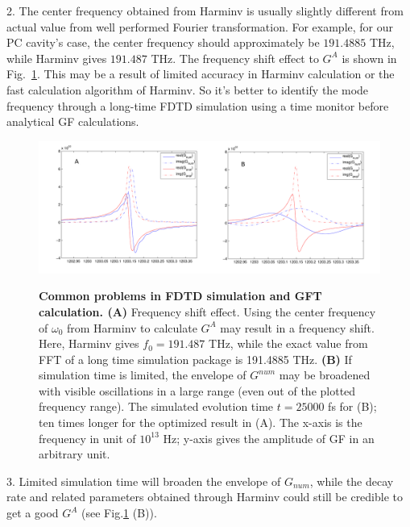 2. The center frequency obtained from Harminv is usually slightly different from actual value from well performed Fourier transformation. For example, for our PC
cavity's case, the center frequency should approximately be $191.4885$ THz, while Harminv gives $191.487$ THz. The frequency shift effect to $G^{A}$ is shown in Fig.~\ref{Gpc_errors}. This may be a result of limited accuracy in Harminv calculation or the fast calculation algorithm of Harminv. So it's better to identify the mode frequency through a long-time FDTD simulation using a time monitor before analytical GF calculations.
\begin{figure}[htp]
\centering
\begin{center}
{\includegraphics[width=14cm]{./Figs/Gpc_errors}}
\end{center}
\caption[Common problems in calculation.]{\textbf{Common problems in FDTD simulation and GFT calculation. (A)} Frequency shift effect. Using the center frequency of $\omega_0$ from Harminv to calculate $G^{A}$ may result in a frequency shift. Here, Harminv gives $f_0=191.487$ THz, while the exact value from FFT of a long time simulation package is 191.4885 THz. \textbf{(B)} If simulation time is limited, the envelope of $G^{num}$ may be broadened with visible oscillations in a large range (even out of the plotted frequency range). The simulated evolution time $t=25000$ fs for (B); ten times longer for the optimized result in (A). The x-axis is the frequency in unit of $10^{13}$ Hz; y-axis gives the amplitude of GF in an arbitrary unit.}
\label{Gpc_errors}
\end{figure}

3. Limited simulation time will broaden the envelope of $G_{num}$, while the decay rate and related parameters obtained through Harminv could still be credible to get a good $G^{A}$ (see Fig.\ref{Gpc_errors} (B)).

